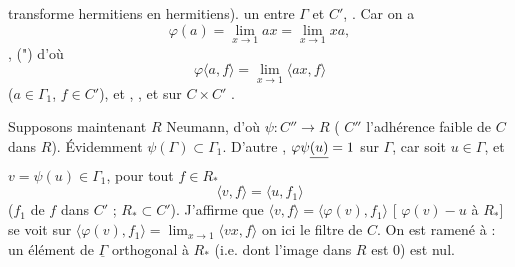 \documentclass[11pt,a4paper]{article}
\begin{document}
transforme hermitiens en hermitiens).   \ill{}  un \emph{} entre $\Gamma$ et $C'$,  \ill{}. Car on a
\[
  \varphi(a) = \lim_{x \to 1} ax = \lim_{x \to 1} xa,
\]
 ,  (") d'où
\[
  \varphi\langle a, f\rangle = \lim_{x \to 1} \langle ax, f\rangle
\]
($a \in \Gamma_1$, $f \in C'$), et      ,  , et    \struck{\ill{}} sur $C \times C'$ .

Supposons maintenant  $R$   Neumann,  d'où  $\psi : C'' \to R$ ( $C''$  l'adhérence faible de $C$ dans $R$). Évidemment $\psi(\Gamma) \subset \Gamma_1$. D'autre , $\varphi\psi\struck{(u)} = 1$ sur $\Gamma$, car soit $u \in \Gamma$, \struck{\ill{}} et $v = \psi(u) \in \Gamma_1$,  pour tout $f \in R_{*}$
\[
  \langle v, f\rangle = \langle u, f_1\rangle
\]
($f_1$  de $f$ dans $C'$ ;     $R_{*} \subset C'$). J'affirme que $\langle v, f\rangle = \langle \varphi(v), f_1\rangle$ [  \struck{$\varphi\psi$} $\varphi(v) - u$  à $R_{*}$]  se voit  sur $\langle \varphi(v), f_1\rangle = \lim_{x \to 1} \langle vx, f\rangle$ on  ici le filtre  \ill{}    de $C$. On est ramené à  : un élément de $\underline{\Gamma}$ orthogonal à $R_{*}$  (i.e. dont l'image dans $R$ est $0$) est nul.
\end{document}
